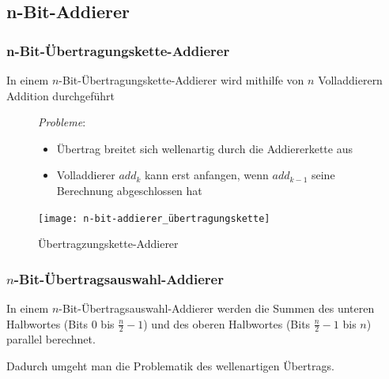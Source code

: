 \documentclass[12pt]{report}
\begin{document}
\subsection{n-Bit-Addierer}
\subsubsection{n-Bit-Übertragungskette-Addierer}
\begin{defbox}
  In einem $n$-Bit-Übertragungskette-Addierer wird mithilfe von $n$ Volladdierern Addition durchgeführt
\end{defbox}
\begin{figure}[H]
  \begin{minipage}[t]{.45\textwidth}
    \par \textit{Probleme}:
    \begin{itemize}
      \item Übertrag breitet sich wellenartig durch die Addiererkette aus
      \item Volladdierer $add_k$ kann erst anfangen, wenn $add_{k-1}$ seine Berechnung abgeschlossen hat
    \end{itemize}
  \end{minipage}
  \hfill
  \begin{minipage}[t]{.45\textwidth}
    \caption{Übertragzungskette-Addierer}
    \centering
    \vspace{0pt}
    \texttt{[image: n-bit-addierer\_übertragungskette]}
  \end{minipage}
\end{figure}

\subsubsection{$n$-Bit-Übertragsauswahl-Addierer}
\begin{defbox}
  In einem $n$-Bit-Übertragsauswahl-Addierer werden die Summen des unteren Halbwortes (Bits 0 bis $\frac{n}{2}-1$) und 
  des oberen Halbwortes (Bits $\frac{n}{2}-1$ bis $n$) parallel berechnet.
  
  Dadurch umgeht man die Problematik des wellenartigen Übertrags.
\end{defbox}
\end{document}
